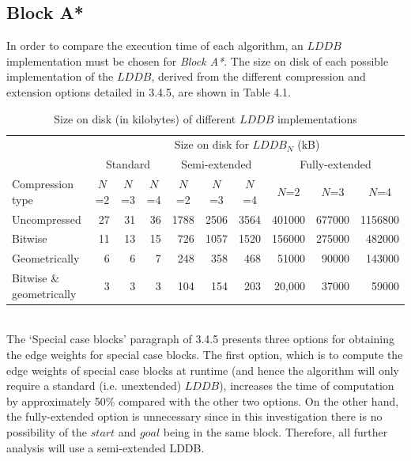 \documentclass[12pt,notitlepage]{report}
\begin{document}
\subsection{Block A*}
In order to compare the execution time of each algorithm, an $LDDB$ implementation must be chosen for {\em Block A*}. The size on disk of each possible implementation of the $LDDB$, derived from the different compression and extension options detailed in 3.4.5, are shown in Table 4.1.\\


\begin{table}
\centering
\begin{tabularx}{\textwidth}{@{}lrrrrrrrrr@{}} \toprule
~ &\multicolumn{9}{c}{Size on disk for $LDDB_{N}$ (kB)}\\ 
\cmidrule(l){2-10}
~ &\multicolumn{3}{c}{Standard} &\multicolumn{3}{c}{Semi-extended} &\multicolumn{3}{c}{Fully-extended}\\ 
\cmidrule(l){2-4} \cmidrule(l){5-7} \cmidrule(l){8-10}
Compression type &\multicolumn{1}{c}{$N$=2} &\multicolumn{1}{c}{$N$=3} &\multicolumn{1}{c}{$N$=4} & \multicolumn{1}{c}{$N$=2} &\multicolumn{1}{c}{$N$=3} &\multicolumn{1}{c}{$N$=4} & \multicolumn{1}{c}{$N$=2} &\multicolumn{1}{c}{$N$=3} &\multicolumn{1}{c}{$N$=4}\\  \midrule
    Uncompressed                        & 27  & 31     & 36     & 1788   & 2506    & 3564 & 401000     & 677000          & 1156800   \\ 
    Bitwise                  & 11       & 13    & 15 & 726      & 1057   & 1520  & 156000      & 275000  & 482000   \\
    Geometrically      & 6        & 6   & 7   & 248      & 358           & 468    & 51000 & 90000     & 143000        \\ 
    Bitwise \& geometrically & 3        & 3  & 3   & 104      & 154           & 203  & 20,000      & 37000           & 59000  \\ \bottomrule
\end{tabularx}
\caption[Size on disk of different $LDDB$ implementations]{Size on disk (in kilobytes) of different $LDDB$ implementations}
\end{table}

\\
\noindent
The `Special case blocks' paragraph of 3.4.5 presents three options for obtaining the edge weights for special case blocks. The first option, which is to compute the edge weights of special case blocks at runtime (and hence the algorithm will only require a standard (i.e. unextended) $LDDB$), increases the time of computation by approximately 50\% compared with the other two options. On the other hand, the fully-extended option is unnecessary since in this investigation there is no possibility of the $start$ and $goal$ being in the same block. Therefore, all further analysis will use a semi-extended LDDB.\\
\end{document}
